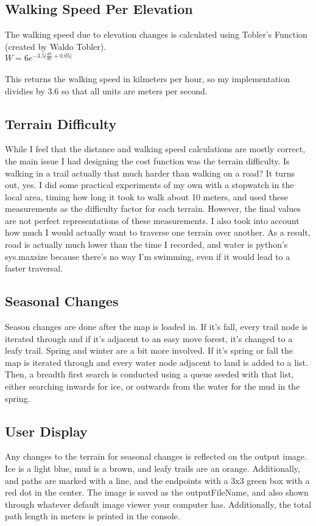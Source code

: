 \documentclass[10pt,a4paper]{article}
\begin{document}
\subsection*{Walking Speed Per Elevation}

The walking speed due to elevation changes is calculated using Tobler's Function (created by Waldo Tobler).\\

$W = 6e^{-3.5\lvert\frac{dh}{dx}+0.05\rvert}$\\\\
This returns the walking speed in kilmeters per hour, so my implementation dividies by 3.6 so that all units are meters per second.

\subsection*{Terrain Difficulty}
While I feel that the distance and walking speed calculations are mostly correct, the main issue I had designing the cost function was the terrain difficulty. Is walking in a trail actually that much harder than walking on a road? It turns out, yes. I did some practical experiments of my own with a stopwatch in the local area, timing how long it took to walk about 10 meters, and used these measurements as the difficulty factor for each terrain. However, the final values are not perfect representations of these measurements. I also took into account how much I would actually want to traverse one terrain over another. As a result, road is actually much lower than the time I recorded, and water is python’s sys.maxsize because there’s no way I’m swimming, even if it would lead to a faster traversal.

\subsection*{Seasonal Changes}
Season changes are done after the map is loaded in. If it’s fall, every trail node is iterated through and if it’s adjacent to an easy move forest, it’s changed to a leafy trail. Spring and winter are a bit more involved. If it’s spring or fall the map is iterated through and every water node adjacent to land is added to a list. Then, a breadth first search is conducted using a queue seeded with that list, either searching inwards for ice, or outwards from the water for the mud in the spring.


\subsection*{User Display}
Any changes to the terrain for seasonal changes is reflected on the output image. Ice is a light blue, mud is a brown, and leafy trails are an orange. Additionally, and paths are marked with a line, and the endpoints with a 3x3 green box with a red dot in the center. The image is saved as the outputFileName, and also shown through whatever default image viewer your computer has. Additionally, the total path length in meters is printed in the console.
\end{document}
